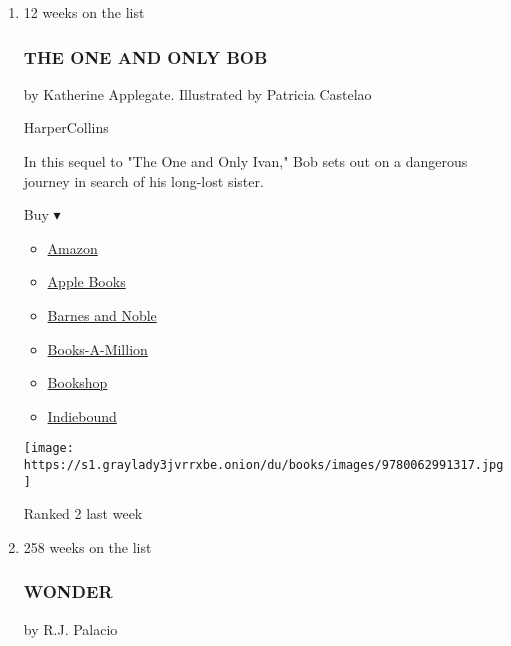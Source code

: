 \begin{enumerate}
\def\labelenumi{\arabic{enumi}.}
\item
  12 weeks on the list

  \hypertarget{the-one-and-only-bob}{%
  \subsubsection{THE ONE AND ONLY BOB}\label{the-one-and-only-bob}}

  by Katherine Applegate. Illustrated by Patricia Castelao

  HarperCollins

  In this sequel to "The One and Only Ivan," Bob sets out on a dangerous
  journey in search of his long-lost sister.

  Buy ▾

  \begin{itemize}
  \tightlist
  \item
    \href{https://www.amazon.com/dp/0062991310?tag=NYTBSREV-20\&tag=NYTBS-20}{Amazon}
  \item
    \href{https://du-gae-books-dot-nyt-du-prd.appspot.com/buy?title=THE+ONE+AND+ONLY+BOB\&author=Katherine+Applegate}{Apple
    Books}
  \item
    \href{https://www.anrdoezrs.net/click-7990613-11819508?url=https\%3A\%2F\%2Fwww.barnesandnoble.com\%2Fw\%2F\%3Fean\%3D9780062991317}{Barnes
    and Noble}
  \item
    \href{https://www.anrdoezrs.net/click-7990613-35140?url=https\%3A\%2F\%2Fwww.booksamillion.com\%2Fp\%2FTHE\%2BONE\%2BAND\%2BONLY\%2BBOB\%2FKatherine\%2BApplegate\%2F9780062991317}{Books-A-Million}
  \item
    \href{https://bookshop.org/a/3546/9780062991317}{Bookshop}
  \item
    \href{https://www.indiebound.org/book/9780062991317?aff=NYT}{Indiebound}
  \end{itemize}

  \texttt{[image: https://s1.graylady3jvrrxbe.onion/du/books/images/9780062991317.jpg]}

  Ranked 2 last week
\item
  258 weeks on the list

  \hypertarget{wonder}{%
  \subsubsection{WONDER}\label{wonder}}

  by R.J. Palacio


\end{enumerate}
